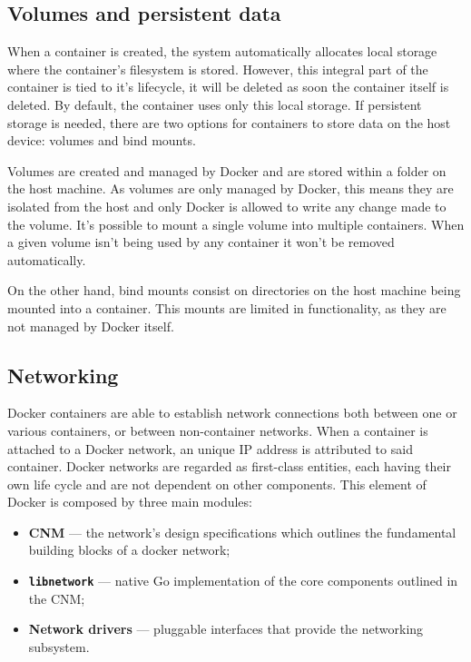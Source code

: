 



\subsection{Volumes and persistent data}
\label{sec::arch:volumes}

When a container is created, the system automatically allocates local storage where the container's filesystem is stored. However, this integral part of the container is tied to it's lifecycle, it will be deleted as soon the container itself is deleted. By default, the container uses only this local storage. If persistent storage is needed, there are two options for containers to store data on the host device: volumes and bind mounts\cite{container-storage}.

Volumes are created and managed by Docker and are stored within a folder on the host machine. As volumes are only managed by Docker, this means they are isolated from the host and only Docker is allowed to write any change made to the volume. It's possible to mount a single volume into multiple containers. When a given volume isn't being used by any container it won't be removed automatically.

On the other hand, bind mounts consist on directories on the host machine being mounted into a container. This mounts are limited in functionality, as they are not managed by Docker itself.




\subsection{Networking}
\label{ssec::arch:net}

Docker containers are able to establish network connections both between one or various containers, or between non-container networks. When a container is attached to a Docker network, an unique \acs{IP} address is attributed to said container. Docker networks are regarded as first-class entities, each having their own life cycle and are not dependent on other components. This element of Docker is composed by three main modules:

\begin{itemize}
    \item \textbf{\ac{CNM}} --- the network's design specifications which outlines the fundamental building blocks of a docker network;
    \item \textbf{\texttt{libnetwork}} --- native Go implementation of the core components outlined in the \ac{CNM};
    \item \textbf{Network drivers} --- pluggable interfaces that provide the networking subsystem.
\end{itemize}


